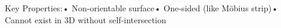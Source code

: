 \documentclass[preview]{standalone}
\begin{document}
\begin{center}
Key Properties:• Non-orientable surface• One-sided (like Möbius strip)• Cannot exist in 3D without self-intersection
\end{center}
\end{document}
